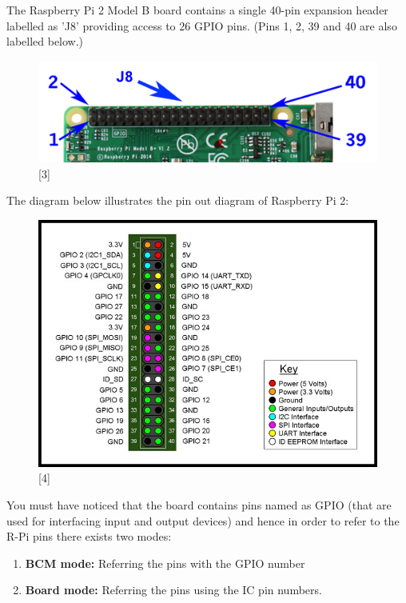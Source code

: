 \documentclass[11pt,a4paper]{report}
\begin{document}
\begin{flushleft}
	The Raspberry Pi 2 Model B board contains a single 40-pin expansion header labelled as 'J8' providing access to 26 GPIO pins.
	(Pins 1, 2, 39 and 40 are also labelled below.)
			\begin{figure}[h!]
				\includegraphics[scale=0.7]{j8h.png}
				\centering
				\caption{[3]}
			\end{figure} 
	
	\newpage
	The diagram below illustrates the pin out diagram of Raspberry Pi 2:
	\begin{figure}[h!]
		\includegraphics[scale=0.6]{RaspberryPi2_pinout.jpg}
		\centering
		\caption{[4]}
	\end{figure} 
	
	\flushleft
	You must have noticed that the board contains pins named as GPIO (that are used for interfacing input and output devices) and hence in order to refer to the R-Pi pins there exists two modes:
	\begin{enumerate}
		\item \textbf{BCM mode:} Referring the pins with the GPIO number
		\item \textbf{Board mode:} Referring the pins using the IC pin numbers.
	\end{enumerate}

\end{flushleft}
\end{document}
